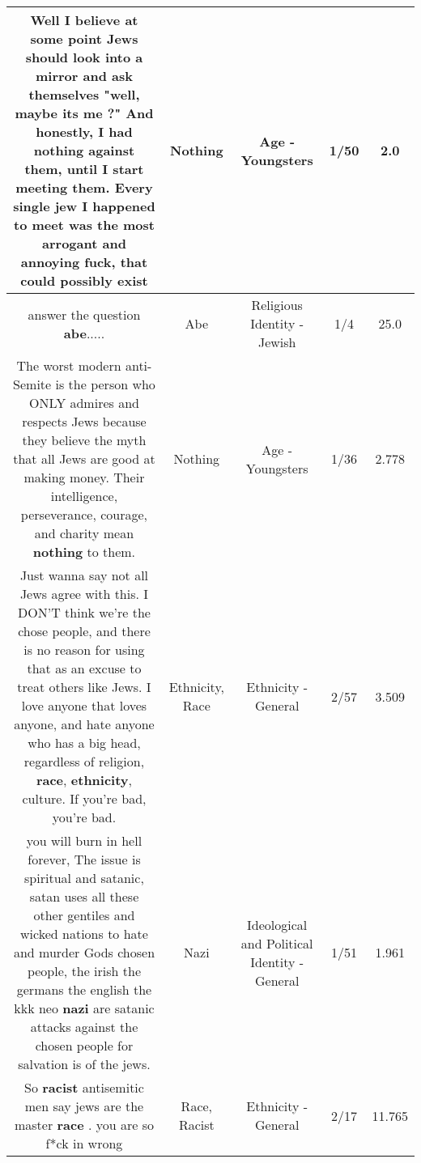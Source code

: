 \documentclass[11pt]{article}
\newlength\mylength
\begin{document}
\begin{center}
\begin{longtable}{|C{.65\mylength}|C{.30\mylength}|C{.12\mylength}|C{.12\mylength}|C{.12\mylength}|}
  \small Well I believe at some point Jews should look into a mirror and ask themselves "well, maybe its me ?" And honestly, I had \textbf{nothing} against them, until I start meeting them.  Every single jew I happened to meet was the most arrogant and annoying fuck, that could possibly exist\normalsize   & Nothing & Age - Youngsters & 1/50 & 2.0 \\  \hline
  \small answer the question \textbf{abe}.....\normalsize   & Abe & Religious Identity - Jewish & 1/4 & 25.0 \\  \hline
  \small The worst modern anti-Semite is the person who ONLY admires and respects Jews because they believe the myth that all Jews are good at making money. Their intelligence, perseverance, courage, and charity mean \textbf{nothing} to them.\normalsize   & Nothing & Age - Youngsters & 1/36 & 2.778 \\  \hline
  \small Just wanna say not all Jews agree with this. I DON'T think we're the chose people, and there is no reason for using that as an excuse to treat others like Jews. I love anyone that loves anyone, and hate anyone who has a big head, regardless of religion, \textbf{race}, \textbf{ethnicity}, culture. If you're bad, you're bad.\normalsize   & Ethnicity, Race & Ethnicity - General & 2/57 & 3.509 \\  \hline
  \small you will burn in hell forever, The issue is spiritual and satanic, satan uses all these other gentiles and wicked nations to hate and murder Gods chosen people, the irish the germans the english the kkk neo \textbf{nazi} are satanic attacks against the chosen people for salvation is of the jews.\normalsize   & Nazi &  Ideological and Political Identity - General & 1/51 & 1.961 \\  \hline
  \small So \textbf{racist} antisemitic men  say jews are the master \textbf{race} . you are  so f*ck in wrong\normalsize   & Race, Racist & Ethnicity - General & 2/17 & 11.765 \\  \hline

\end{longtable}
\end{center}
\end{document}
